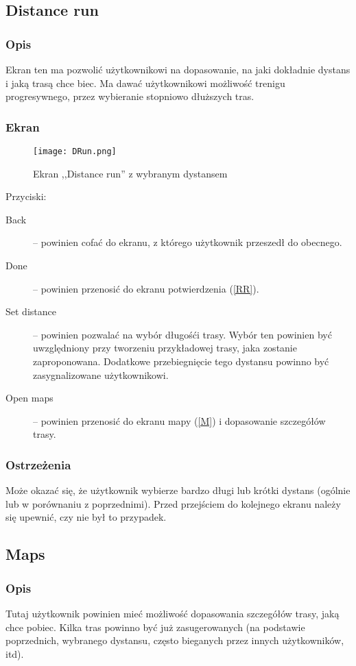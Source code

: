 \subsection{Distance run}
\subsubsection{Opis}
\noindent Ekran ten ma pozwolić użytkownikowi na dopasowanie, na jaki dokładnie dystans i jaką trasą chce biec. Ma dawać użytkownikowi możliwość trenigu progresywnego, przez wybieranie stopniowo dłuższych tras.
\subsubsection{Ekran}
\begin{figure}[b!]
  \texttt{[image: DRun.png]}
  \caption{Ekran ,,Distance run'' z wybranym dystansem}
  \label{DR}
\end{figure}
Przyciski:\\
\begin{description}
  \item[Back] -- powinien cofać do ekranu, z którego użytkownik przeszedł do obecnego.
  \item[Done] -- powinien przenosić do ekranu potwierdzenia (\ref{RR}).
  \item[Set distance] -- powinien pozwalać na wybór długośći trasy. Wybór ten powinien być uwzględniony przy tworzeniu przykładowej trasy, jaka zostanie zaproponowana. Dodatkowe przebiegnięcie tego dystansu powinno być zasygnalizowane użytkownikowi.
  \item[Open maps] -- powinien przenosić do ekranu mapy (\ref{M}) i dopasowanie szczegółów trasy.
\end{description}
\subsubsection{Ostrzeżenia}
\noindent Może okazać się, że użytkownik wybierze bardzo długi lub krótki dystans (ogólnie lub w porównaniu z poprzednimi). Przed przejściem do kolejnego ekranu należy się upewnić, czy nie był to przypadek.
\subsection{Maps}
\subsubsection{Opis}
\noindent Tutaj użytkownik powinien mieć możliwość dopasowania szczegółów trasy, jaką chce pobiec. Kilka tras powinno być już zasugerowanych (na podstawie poprzednich, wybranego dystansu, często bieganych przez innych użytkowników, itd).
